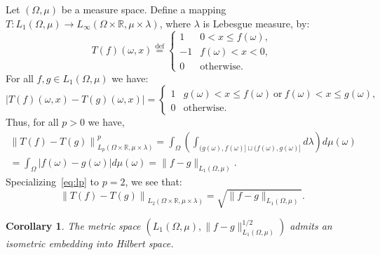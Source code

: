 \documentclass{icm2010}
\newtheorem{cor}[theorem]{Corollary}
\theoremstyle{definition}
\newcommand{\R}{\mathbb{R}}
\newcommand{\eqdef}{\stackrel{\mathrm{def}}{=}}
\newcommand{\1}{\mathbf{1}}
\renewcommand{\le}{\leqslant}
\begin{document}
Let $(\Omega,\mu)$ be a measure space. Define a mapping
$T:L_1(\Omega,\mu)\to L_\infty(\Omega\times \R,\mu\times \lambda)$,
where $\lambda$ is Lebesgue measure, by:
\begin{equation*}\label{eq:def T}
T(f)(\omega,x)\eqdef \left\{
\begin{array}{ll}1& 0< x\le f(\omega),\\
-1 & f(\omega)<x<0,\\
0& \mathrm{otherwise}.\end{array}\right.
\end{equation*}
For all $f,g\in L_1(\Omega,\mu)$ we have:
\begin{equation*}\label{eq:difference}
\Big|T(f)(\omega,x)-T(g)(\omega,x)\Big|= \left\{
\begin{array}{ll}1& g(\omega)< x\le f(\omega)\ \mathrm{or}\ f(\omega)< x\le g(\omega),\\
0& \mathrm{otherwise}.\end{array}\right.
\end{equation*}
Thus, for all $p>0$ we have,
\begin{multline}\label{eq:lp}
\left\|T(f)-T(g)\right\|_{L_p(\Omega\times \R,\mu\times \lambda)}^p
=\int_{\Omega} \left(\int_{(g(\omega),f(\omega)]\sqcup
(f(\omega),g(\omega)]} d\lambda\right)d\mu(\omega)\\=\int_\Omega
|f(\omega)-g(\omega)|d\mu(\omega)=\|f-g\|_{L_1(\Omega,\mu)}.
\end{multline}
Specializing~\eqref{eq:lp} to $p=2$, we see that:
\begin{equation*}\label{eq:NEG}
\left\|T(f)-T(g)\right\|_{L_2(\Omega\times \R,\mu\times \lambda)}=\sqrt{\|f-g\|_{L_1(\Omega,\mu)}}.
\end{equation*}
\begin{cor}\label{cor:NEG}
The metric space $\left(L_1(\Omega,\mu),\|f-g\|_{L_1(\Omega,\mu)}^{1/2}\right)$ admits an isometric embedding into Hilbert space.
\end{cor}
\end{document}
